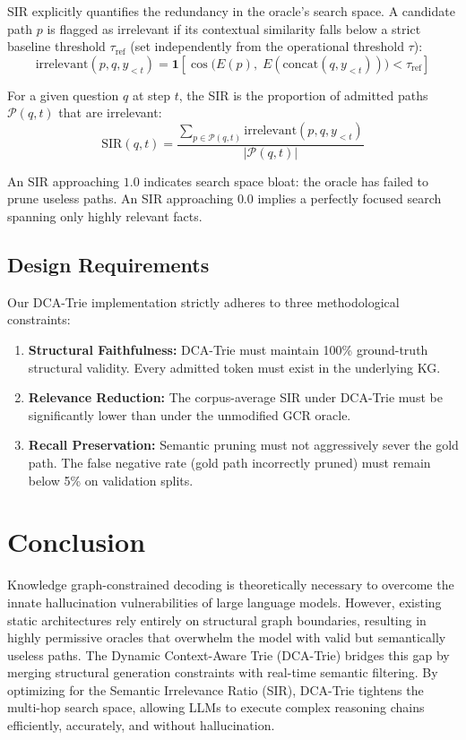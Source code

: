 \documentclass[11pt, letterpaper]{article}
\begin{document}
SIR explicitly quantifies the redundancy in the oracle's search space. A candidate path $p$ is flagged as irrelevant if its contextual similarity falls below a strict baseline threshold $\tau_{\text{ref}}$ (set independently from the operational threshold $\tau$):
\begin{equation}
    \text{irrelevant}(p, q, y_{<t}) = \mathbf{1}\!\left[
        \cos\!\bigl(E(p),\; E(\text{concat}(q, y_{<t}))\bigr) < \tau_{\text{ref}}
        \right]
\end{equation}

For a given question $q$ at step $t$, the SIR is the proportion of admitted paths $\mathcal{P}(q, t)$ that are irrelevant:
\begin{equation}
    \text{SIR}(q, t) = \frac{\sum_{p \in \mathcal{P}(q,t)} \text{irrelevant}(p, q, y_{<t})}{|\mathcal{P}(q, t)|}
\end{equation}

An SIR approaching $1.0$ indicates search space bloat: the oracle has failed to prune useless paths. An SIR approaching $0.0$ implies a perfectly focused search spanning only highly relevant facts.

\subsection{Design Requirements}

Our DCA-Trie implementation strictly adheres to three methodological constraints:
\begin{enumerate}
    \item \textbf{Structural Faithfulness:} DCA-Trie must maintain 100\% ground-truth structural validity. Every admitted token must exist in the underlying KG.
    \item \textbf{Relevance Reduction:} The corpus-average SIR under DCA-Trie must be significantly lower than under the unmodified GCR oracle.
    \item \textbf{Recall Preservation:} Semantic pruning must not aggressively sever the gold path. The false negative rate (gold path incorrectly pruned) must remain below 5\% on validation splits.
\end{enumerate}

\section{Conclusion}

Knowledge graph-constrained decoding is theoretically necessary to overcome the innate hallucination vulnerabilities of large language models. However, existing static architectures rely entirely on structural graph boundaries, resulting in highly permissive oracles that overwhelm the model with valid but semantically useless paths. The Dynamic Context-Aware Trie (DCA-Trie) bridges this gap by merging structural generation constraints with real-time semantic filtering. By optimizing for the Semantic Irrelevance Ratio (SIR), DCA-Trie tightens the multi-hop search space, allowing LLMs to execute complex reasoning chains efficiently, accurately, and without hallucination.



\end{document}
